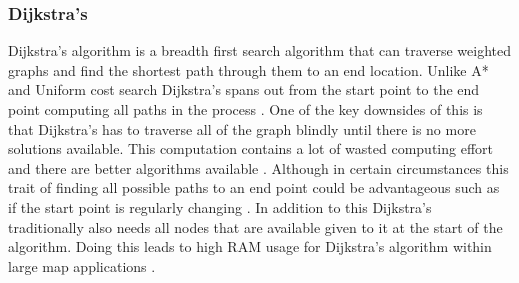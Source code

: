 \subsubsection{Dijkstra's}
Dijkstra’s algorithm is a breadth first search algorithm that can traverse weighted graphs and find the shortest path through them to an end location. Unlike A* and Uniform cost search Dijkstra’s spans out from the start point to the end point computing all paths in the process \citetemp. One of the key downsides of this is that Dijkstra’s has to traverse all of the graph blindly until there is no more solutions available. This computation contains a lot of wasted computing effort and there are better algorithms available \citetemp. Although in certain circumstances this trait of finding all possible paths to an end point could be advantageous such as if the start point is regularly changing \citetemp.
In addition to this Dijkstra’s traditionally also needs all nodes that are available given to it at the start of the algorithm. Doing this leads to high RAM usage for Dijkstra’s algorithm within large map applications \citetemp. 
